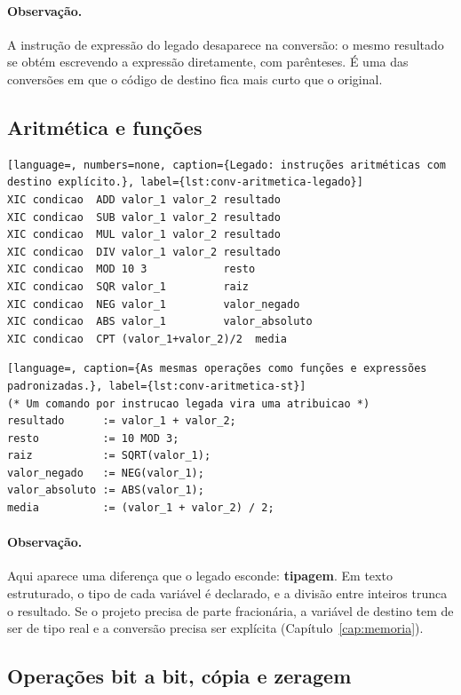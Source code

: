 \paragraph{Observação.} A instrução de expressão do legado desaparece na conversão: o mesmo resultado se
obtém escrevendo a expressão diretamente, com parênteses. É uma das conversões em que o código de
destino fica mais curto que o original.

\subsection{Aritmética e funções}

\begin{lstlisting}[language=, numbers=none, caption={Legado: instruções aritméticas com destino explícito.}, label={lst:conv-aritmetica-legado}]
XIC condicao  ADD valor_1 valor_2 resultado
XIC condicao  SUB valor_1 valor_2 resultado
XIC condicao  MUL valor_1 valor_2 resultado
XIC condicao  DIV valor_1 valor_2 resultado
XIC condicao  MOD 10 3            resto
XIC condicao  SQR valor_1         raiz
XIC condicao  NEG valor_1         valor_negado
XIC condicao  ABS valor_1         valor_absoluto
XIC condicao  CPT (valor_1+valor_2)/2  media
\end{lstlisting}

\begin{lstlisting}[language=, caption={As mesmas operações como funções e expressões padronizadas.}, label={lst:conv-aritmetica-st}]
(* Um comando por instrucao legada vira uma atribuicao *)
resultado      := valor_1 + valor_2;
resto          := 10 MOD 3;
raiz           := SQRT(valor_1);
valor_negado   := NEG(valor_1);
valor_absoluto := ABS(valor_1);
media          := (valor_1 + valor_2) / 2;
\end{lstlisting}

\paragraph{Observação.} Aqui aparece uma diferença que o legado esconde: \textbf{tipagem}. Em texto
estruturado, o tipo de cada variável é declarado, e a divisão entre inteiros trunca o resultado. Se o
projeto precisa de parte fracionária, a variável de destino tem de ser de tipo real e a conversão
precisa ser explícita (Capítulo~\ref{cap:memoria}).

\subsection{Operações bit a bit, cópia e zeragem}

